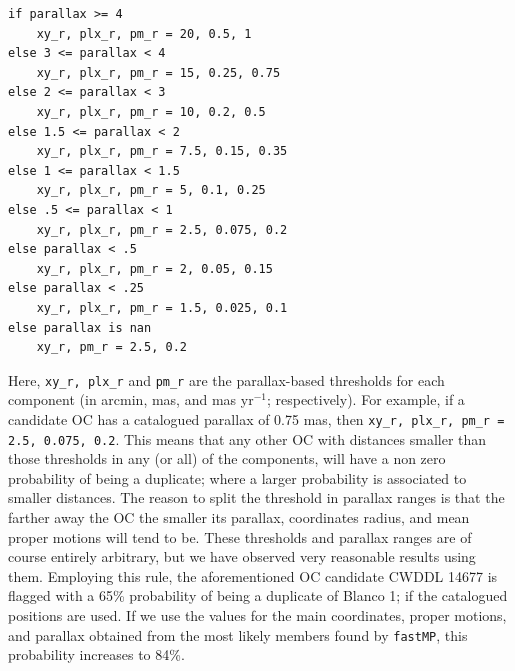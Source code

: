 \documentclass[fleqn,usenatbib]{mnras}
\begin{document}
\begin{verbatim}
if parallax >= 4
    xy_r, plx_r, pm_r = 20, 0.5, 1
else 3 <= parallax < 4
    xy_r, plx_r, pm_r = 15, 0.25, 0.75
else 2 <= parallax < 3
    xy_r, plx_r, pm_r = 10, 0.2, 0.5
else 1.5 <= parallax < 2
    xy_r, plx_r, pm_r = 7.5, 0.15, 0.35
else 1 <= parallax < 1.5
    xy_r, plx_r, pm_r = 5, 0.1, 0.25
else .5 <= parallax < 1
    xy_r, plx_r, pm_r = 2.5, 0.075, 0.2
else parallax < .5
    xy_r, plx_r, pm_r = 2, 0.05, 0.15
else parallax < .25
    xy_r, plx_r, pm_r = 1.5, 0.025, 0.1
else parallax is nan
    xy_r, pm_r = 2.5, 0.2
\end{verbatim}

Here, \texttt{xy\_r, plx\_r} and \texttt{pm\_r} are the parallax-based
thresholds for each component (in arcmin, mas, and mas yr$^{-1}$; respectively).
For example, if a candidate OC has a catalogued parallax of 0.75 mas, then 
\texttt{xy\_r, plx\_r, pm\_r = 2.5, 0.075, 0.2}. This
means that any other OC with distances smaller than those thresholds in any (or
all) of the components, will have a non zero probability of being a duplicate;
where a larger probability is associated to smaller distances.
The reason to split the threshold in parallax ranges is that the farther away
the OC the smaller its parallax, coordinates radius, and mean proper motions
will tend to be. These thresholds and parallax ranges are of course entirely
arbitrary, but we have observed very reasonable results using them.
%
Employing this rule, the aforementioned OC candidate CWDDL 14677 is flagged with
a 65\% probability of being a duplicate of Blanco 1; if the catalogued positions
are used. If we use the values for the main coordinates, proper motions, and
parallax obtained from the most likely members found by \texttt{fastMP}, this
probability increases to 84\%.\\
\end{document}
